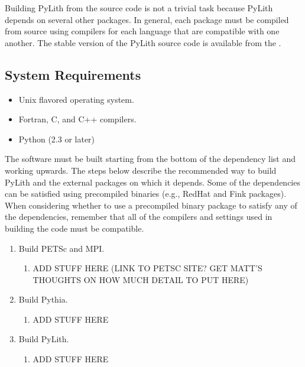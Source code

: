 Building PyLith from the source code is not a trivial task because
PyLith depends on several other packages. In general, each package
must be compiled from source using compilers for each language that
are compatible with one another. The stable version of the PyLith
source code is available from the 
.

\subsection{System Requirements}

\begin{itemize}
\item Unix flavored operating system.
\item Fortran, C, and C++ compilers.
\item Python (2.3 or later)
\end{itemize}

The software must be built starting from the bottom of the dependency
list and working upwards. The steps below describe the recommended way
to build PyLith and the external packages on which it depends. Some of
the dependencies can be satisfied using precompiled binaries (e.g.,
RedHat and Fink packages). When considering whether to use a
precompiled binary package to satisfy any of the dependencies,
remember that all of the compilers and settings used in building the
code must be compatible.

\begin{enumerate}
\item Build PETSc and MPI.
  \begin{enumerate}
  \item ADD STUFF HERE (LINK TO PETSC SITE? GET MATT'S THOUGHTS ON HOW
    MUCH DETAIL TO PUT HERE)
  \end{enumerate}
\item Build Pythia.
  \begin{enumerate}
  \item ADD STUFF HERE
  \end{enumerate}
\item Build PyLith.
  \begin{enumerate}
  \item ADD STUFF HERE
  \end{enumerate}
\end{enumerate}


